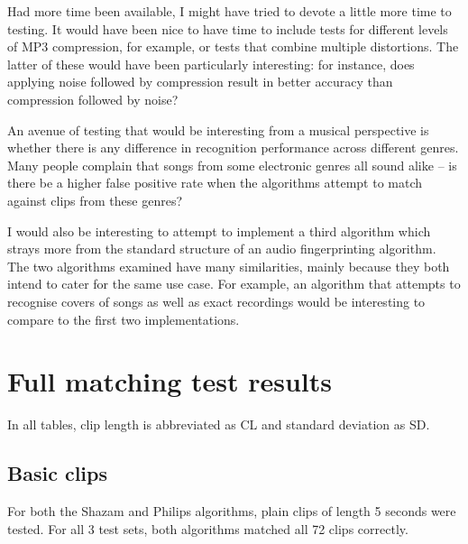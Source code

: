 \documentclass[12pt,a4paper,twoside,openright]{report}
\begin{document}
Had more time been available, I might have tried to devote a little more time to testing. It would have been nice to have time to include tests for different levels of MP3 compression, for example, or tests that combine multiple distortions. The latter of these would have been particularly interesting: for instance, does applying noise followed by compression result in better accuracy than compression followed by noise?

An avenue of testing that would be interesting from a musical perspective is whether there is any difference in recognition performance across different genres. Many people complain that songs from some electronic genres all sound alike -- is there be a higher false positive rate when the algorithms attempt to match against clips from these genres?

I would also be interesting to attempt to implement a third algorithm which strays more from the standard structure of an audio fingerprinting algorithm. The two algorithms examined have many similarities, mainly because they both intend to cater for the same use case. For example, an algorithm that attempts to recognise covers of songs as well as exact recordings would be interesting to compare to the first two implementations.





\appendix



\chapter{Full matching test results}
\label{full_results}

In all tables, clip length is abbreviated as CL and standard deviation as SD.


\section{Basic clips}

For both the Shazam and Philips algorithms, plain clips of length 5 seconds were tested. For all 3 test sets, both algorithms matched all 72 clips correctly.
\end{document}
